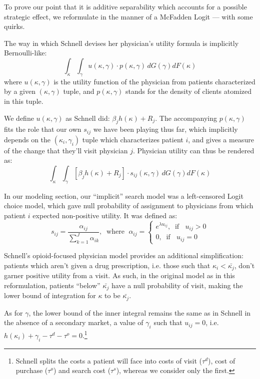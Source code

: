 \documentclass[../main.tex]{subfiles}
\begin{document}
To prove our point that it is additive separability which accounts for a possible strategic effect, we reformulate \cite{schnell2017physician} in the manner of a McFadden Logit — with some quirks.

The way in which Schnell devises her physician's utility formula is implicitly Bernoulli-like:
\[
\int_{\kappa} \int_{\gamma} u(\kappa, \gamma) \cdot p(\kappa, \gamma) \, dG(\gamma) dF(\kappa)
\]
where $u(\kappa, \gamma)$ is the utility function of the physician from patients characterized by a given $(\kappa, \gamma)$ tuple, and $p(\kappa, \gamma)$ stands for the density of clients atomized in this tuple.

We define $u(\kappa, \gamma)$ as Schnell did: $\beta_j h(\kappa) + R_j$. The accompanying $p(\kappa, \gamma)$ fits the role that our own $s_{ij}$ we have been playing thus far, which implicitly depends on the $(\kappa_i, \gamma_i)$ tuple which characterizes patient $i$, and gives a measure of the change that they'll visit physician $j$. Physician utility can thus be rendered as:
\[
\int_{\kappa} \int_{\gamma} [\beta_j h(\kappa) + R_j] \cdot s_{ij}(\kappa, \gamma) \, dG(\gamma) dF(\kappa)
\]


In our modeling section, our ``implicit'' search model was a left-censored Logit choice model, which gave null probability of assignment to physicians from which patient $i$ expected non-positive utility. It was defined as:
\[
s_{ij} = \frac{\alpha_{ij}}{\sum_{k = 1}^{J} \alpha_{ik}}, \; \; \text{where } \; \alpha_{ij} = \begin{cases}
e^{\lambda u_{ij}}, \; \; \text{if } \; \; u_{ij} > 0 \\
0 , \; \; \text{if } \; \; u_{ij} = 0
\end{cases}
\]

Schnell's opioid-focused physician model provides an additional simplification: patients which aren't given a drug prescription, i.e. those such that $\kappa_i < \bar{\kappa_j}$, don't garner positive utility from a visit. As such, in the original model as in this reformulation, patients ``below'' $\bar{\kappa_j}$ have a null probability of visit, making the lower bound of integration for $\kappa$ to be $\bar{\kappa_j}$.

As for $\gamma$, the lower bound of the inner integral remains the same as in Schnell in the absence of a secondary market, a value of $\gamma_i$ such that $u_{ij} = 0$, i.e. $h(\kappa_i) + \gamma_i - \tau^d - \tau^o = 0$.\footnote{Schnell splits the costs a patient will face into costs of visit ($\tau^d$), cost of purchase ($\tau^o$) and search cost ($\tau^s$), whereas we consider only the first.}
\end{document}
